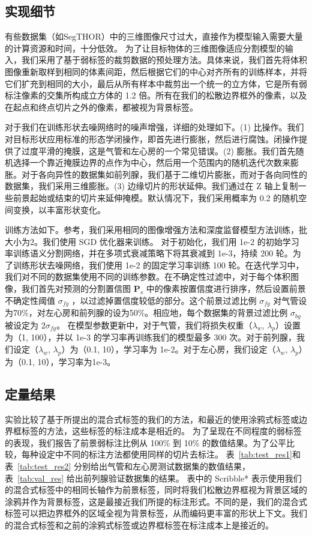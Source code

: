 \subsection{实现细节} \label{sec:detail}

有些数据集（如SegTHOR）中的三维图像尺寸过大，直接作为模型输入需要大量的计算资源和时间，十分低效。
为了让目标物体的三维图像适应分割模型的输入，我们采用了基于弱标签的裁剪数据的预处理方法。具体来说，我们首先将体积图像重新取样到相同的体素间距，然后根据它们的中心对齐所有的训练样本，并将它们扩充到相同的大小，最后从所有样本中裁剪出一个统一的立方体，它是所有弱标注像素的交集所构成立方体的 1.2 倍。所有在我们的松散边界框外的像素，以及在起点和终点切片之外的像素，都被视为背景标签。

对于我们在训练形状去噪网络时的噪声增强，详细的处理如下。(1) 比操作。我们对目标形状应用标准的形态学闭操作，即首先进行膨胀，然后进行腐蚀。闭操作提供了过度平滑的掩膜，这是气管和左心房的一个常见错误。(2) 膨胀。我们首先随机选择一个靠近掩膜边界的点作为中心，然后用一个范围内的随机迭代次数来膨胀。对于各向异性的数据集如前列腺，我们基于二维切片膨胀，而对于各向同性的数据集，我们采用三维膨胀。(3) 边缘切片的形状延伸。我们通过在 Z 轴上复制一些前景起始或结束的切片来延伸掩模。默认情况下，我们采用概率为 0.2 的随机空间变换，以丰富形状变化。

训练方法如下。参考\citet{isensee2019automated}，我们采用相同的图像增强方法和深度监督模型方法训练，批大小为2。我们使用 SGD 优化器来训练。
对于初始化，我们用 1e-2 的初始学习率训练语义分割网络，并在多项式衰减策略下将其衰减到 1e-3，持续 200 轮。为了训练形状去噪网络，我们使用 1e-2 的固定学习率训练 100 轮。在迭代学习中，我们对不同的数据集使用不同的训练参数。在不确定性过滤中，对于每个体积图像，我们首先对预测的分割置信图 $\mathbf{P}_s$ 中的像素按置信度进行排序，然后设置前景不确定性阈值 $\sigma_{fg}$ ，以过滤掉置信度较低的部分。这个前景过滤比例 $\sigma_{fg}$ 对气管设为70\%，对左心房和前列腺的设为50\%。相应地，每个数据集的背景过滤比例 $\sigma_{bg}$ 被设定为  $2\sigma_{fg}$。
在模型参数更新中，对于气管，我们将损失权重（$\lambda_w$, $\lambda_p$）设置为（1, 100），并以 1e-3 的学习率再训练我们的模型最多 300 次。对于前列腺，我们设定（$\lambda_w$, $\lambda_p$）为（0.1, 10），学习率为 1e-2。对于左心房，我们设定（$\lambda_w$, $\lambda_p$）为（0.1, 10），学习率为1e-3。


\subsection{定量结果} \label{sec:res1}

实验比较了基于所提出的混合式标签的我们的方法，和最近的使用涂鸦式标签或边界框标签的方法，这些标签的标注成本是相近的。
为了呈现在不同程度的弱标签的表现，我们报告了前景弱标注比例从 100\% 到 10\% 的数值结果。为了公平比较，每种设定中不同的标注方法都使用同样的切片去标注。
表~\ref{tab:test_res1}和表~\ref{tab:test_res2} 分别给出气管和左心房测试数据集的数值结果，表~\ref{tab:val_res} 给出前列腺验证数据集的结果。
表中的 Scribble* 表示使用我们的混合式标签中的相同长轴作为前景标签，同时将我们松散边界框视为背景区域的涂鸦并作为背景标签，这是最接近我们所提的标注形式。不同的是，我们的混合式标签可以把边界框外的区域全视为背景标签，从而编码更丰富的形状上下文。我们的混合式标签和之前的涂鸦式标签或边界框标签在标注成本上是接近的。

